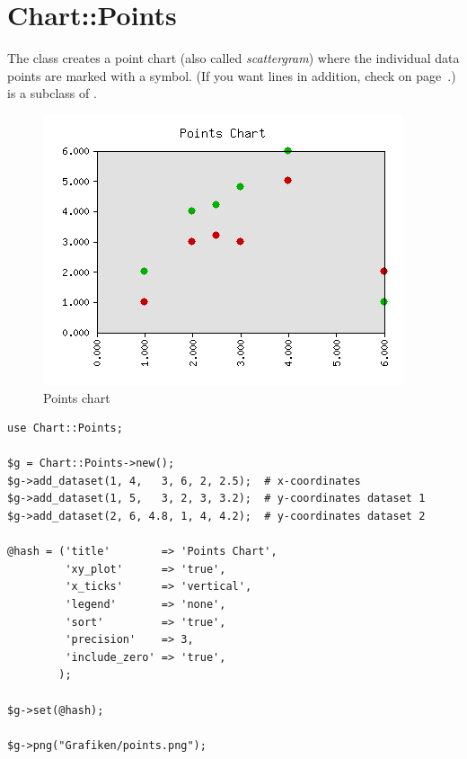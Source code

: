 %
%
\renewcommand{\thisname}{Chart::Points}
\section{\thisname}
\name{\thisname}
\begin{Description}
The class \thisclass creates a point chart (also called
\emph{scattergram}) where the individual data points are marked with a
symbol. (If you want lines in addition, check
 on page~\pageref{Chart::LinesPoints}.)
\thisclass is a subclass of .
\end{Description}

\example
\begin{figure}[ht]
  \begin{center}
    \includegraphics[scale=0.5]{points.png}
  \end{center}
  \caption{Points chart}
  \label{fig:points}
\end{figure}

\begin{verbatim}
use Chart::Points;

$g = Chart::Points->new();
$g->add_dataset(1, 4,   3, 6, 2, 2.5);  # x-coordinates
$g->add_dataset(1, 5,   3, 2, 3, 3.2);  # y-coordinates dataset 1
$g->add_dataset(2, 6, 4.8, 1, 4, 4.2);  # y-coordinates dataset 2

@hash = ('title'        => 'Points Chart',
         'xy_plot'      => 'true',
         'x_ticks'      => 'vertical',
         'legend'       => 'none',
         'sort'         => 'true',
         'precision'    => 3,
         'include_zero' => 'true',
        );

$g->set(@hash);

$g->png("Grafiken/points.png");
\end{verbatim}

